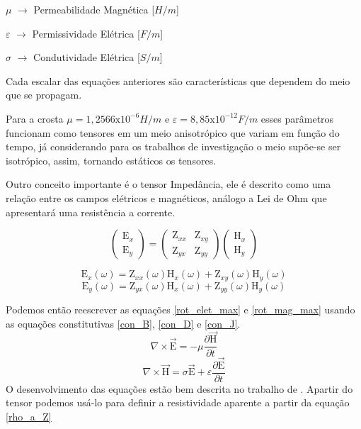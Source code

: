 	    $\mu$ $\rightarrow$ Permeabilidade Magnética [$H/m$]
	    
	    $\varepsilon$ $\rightarrow$ Permissividade Elétrica [$F/m$]
	    
	    $\sigma$ $\rightarrow$ Condutividade Elétrica [$S/m$]
	    
	    Cada escalar das equações anteriores são características que dependem do meio 
	    que se propagam.
	    
	    Para a crosta $\mu = 1,2566\textrm{x}10^{-6} H/m$ e $\varepsilon = 8,85
	    \textrm{x}10^{-12} F/m$ esses parâmetros funcionam como tensores em um meio
	    anisotrópico que variam em função do tempo, já considerando para os 
	    trabalhos de investigação o meio supõe-se ser isotrópico, assim, 
	    tornando estáticos os tensores.
	    
	    Outro conceito importante é o tensor Impedância, ele é descrito como uma
	    relação entre os campos elétricos e magnéticos, análogo a Lei de Ohm \cite{eletromag8hayt}
	    que apresentará uma resistência a corrente.
	    
	    \begin{equation}
		\left (\begin{array}{c}
		 \textrm{E}_x\\
		 \textrm{E}_y
		\end{array}\right)
		=
		\left (\begin{array}{cc}
		 \textrm{Z}_{xx} & \textrm{Z}_{xy}\\
		 \textrm{Z}_{yx} & \textrm{Z}_{yy}
		\end{array}\right) \left (\begin{array}{c}
		 \textrm{H}_x\\
		 \textrm{H}_y
		\end{array}\right)
	    \end{equation}
	    
	    \begin{equation}
	     \textrm{E}_x (\omega)=\textrm{Z}_{xx}(\omega) \textrm{H}_{x}(\omega) + \textrm{Z}_{xy}(\omega) \textrm{H}_{y}(\omega)
	    \end{equation}
	    \begin{equation}
	     \textrm{E}_y (\omega)=\textrm{Z}_{yx}(\omega) \textrm{H}_{x}(\omega) + \textrm{Z}_{yy}(\omega) \textrm{H}_{y}(\omega)
	    \end{equation}  
	    
	    Podemos então reescrever as equações \ref{rot_elet_max}
	    e \ref{rot_mag_max} usando as equações constitutivas \ref{con_B}, \ref{con_D}
	    e \ref{con_J}.
	    \begin{equation}
	     \nabla \times \vec{\textrm{E}} = - \mu \frac{\partial \vec{\textrm{H}}}{\partial t} 
	    \end{equation}
	    \begin{equation}
	     \nabla \times \vec{\textrm{H}} = \sigma \vec{\textrm{E}} + \varepsilon \frac{\partial \vec{\textrm{E}}}{\partial t} 
	    \end{equation}
	    O desenvolvimento das equações estão bem descrita no trabalho de \citeauthor{didana2010}\citeyearpar{didana2010}.
	    Apartir do tensor podemos usá-lo para definir a resistividade aparente a partir da equação \ref{rho_a_Z}
	    
